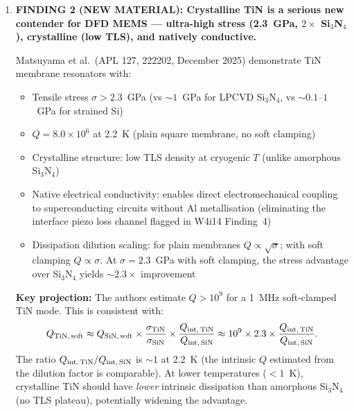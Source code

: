 \documentclass[11pt]{article}
\theoremstyle{definition}
\theoremstyle{remark}
\newcommand{\ee}[1]{\times 10^{#1}}
\newcommand{\verdict}[1]{\textcolor{green!50!black}{\textbf{VERDICT:} #1}}
\begin{document}
\begin{tcolorbox}[colback=blue!5!white, colframe=blue!50!black,
  title=\textbf{W4i15 TOP 5 FINDINGS --- Ranked by Programme Impact}]
\begin{enumerate}
\verdict{The $Q > 10^9$ target is achievable by 2028 via Path A
(crystalline Si at 7~K, highest confidence, existing demonstration
in nanostring geometry) or Path C (TiN with soft clamping, novel
but with strong projection). Path B provides the room-temperature
fallback. The DFD programme should pursue Paths A and C in parallel.}

\item \textbf{FINDING 2 (NEW MATERIAL): Crystalline TiN is a
serious new contender for DFD MEMS --- ultra-high stress
(2.3~GPa, $2\times$ Si$_3$N$_4$), crystalline (low TLS),
and natively conductive.}

Matsuyama et al.\ (APL 127, 222202, December 2025) demonstrate
TiN membrane resonators with:
\begin{itemize}[nosep]
\item Tensile stress $\sigma > 2.3$~GPa (vs $\sim 1$~GPa for
  LPCVD Si$_3$N$_4$, vs $\sim 0.1$--$1$~GPa for strained Si)
\item $Q = 8.0\ee{6}$ at 2.2~K (plain square membrane, no soft
  clamping)
\item Crystalline structure: low TLS density at cryogenic $T$
  (unlike amorphous Si$_3$N$_4$)
\item Native electrical conductivity: enables direct
  electromechanical coupling to superconducting circuits without
  Al metallisation (eliminating the interface piezo loss channel
  flagged in W4i14 Finding~4)
\item Dissipation dilution scaling: for plain membranes
  $Q \propto \sqrt{\sigma}$; with soft clamping $Q \propto \sigma$.
  At $\sigma = 2.3$~GPa with soft clamping, the stress advantage
  over Si$_3$N$_4$ yields $\sim 2.3\times$ improvement
\end{itemize}

\textbf{Key projection:} The authors estimate $Q > 10^9$ for a
1~MHz soft-clamped TiN mode. This is consistent with:
\begin{equation}
Q_{\rm TiN,\,soft} \approx Q_{\rm SiN,\,soft} \times
\frac{\sigma_{\rm TiN}}{\sigma_{\rm SiN}} \times
\frac{Q_{\rm int,\,TiN}}{Q_{\rm int,\,SiN}}
\approx 10^9 \times 2.3 \times \frac{Q_{\rm int,\,TiN}}{Q_{\rm int,\,SiN}}.
\label{eq:tin_projection}
\end{equation}
The ratio $Q_{\rm int,\,TiN}/Q_{\rm int,\,SiN}$ is $\sim 1$ at
2.2~K (the intrinsic $Q$ estimated from the dilution factor is
comparable). At lower temperatures ($< 1$~K), crystalline TiN
should have \textit{lower} intrinsic dissipation than amorphous
Si$_3$N$_4$ (no TLS plateau), potentially widening the advantage.


\end{enumerate}
\end{tcolorbox}
\end{document}
